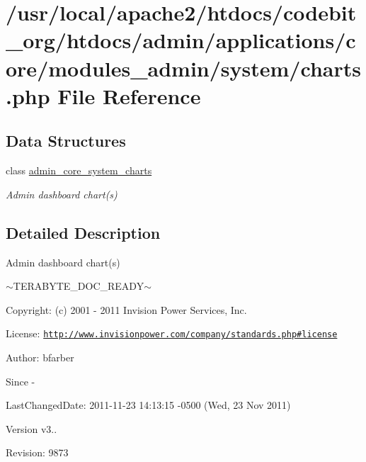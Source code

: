 \hypertarget{charts_8php}{\section{/usr/local/apache2/htdocs/codebit\-\_\-org/htdocs/admin/applications/core/modules\-\_\-admin/system/charts.php File Reference}
\label{charts_8php}
}
\subsection*{Data Structures}
\begin{DoxyCompactItemize}
\item 
class \hyperlink{classadmin__core__system__charts}{admin\-\_\-core\-\_\-system\-\_\-charts}
\begin{DoxyCompactList}\small\item\em Admin dashboard chart(s) \end{DoxyCompactList}\end{DoxyCompactItemize}


\subsection{Detailed Description}
\begin{DoxyVerb}  Admin dashboard chart(s)
\end{DoxyVerb}
 $\sim$\-T\-E\-R\-A\-B\-Y\-T\-E\-\_\-\-D\-O\-C\-\_\-\-R\-E\-A\-D\-Y$\sim$ \begin{DoxyParagraph}{Copyright\-:}
(c) 2001 -\/ 2011 Invision Power Services, Inc.
\end{DoxyParagraph}
\begin{DoxyParagraph}{License\-:}
\href{http://www.invisionpower.com/company/standards.php#license}{\tt http\-://www.\-invisionpower.\-com/company/standards.\-php\#license}
\end{DoxyParagraph}
\begin{DoxyParagraph}{Author\-:}
bfarber 
\end{DoxyParagraph}
\begin{DoxySince}{Since}
-\/ 
\end{DoxySince}
\begin{DoxyParagraph}{Last\-Changed\-Date\-:}
2011-\/11-\/23 14\-:13\-:15 -\/0500 (Wed, 23 Nov 2011) 
\end{DoxyParagraph}
\begin{DoxyVersion}{Version}
v3.. 
\end{DoxyVersion}
\begin{DoxyParagraph}{Revision\-:}
9873 
\end{DoxyParagraph}
